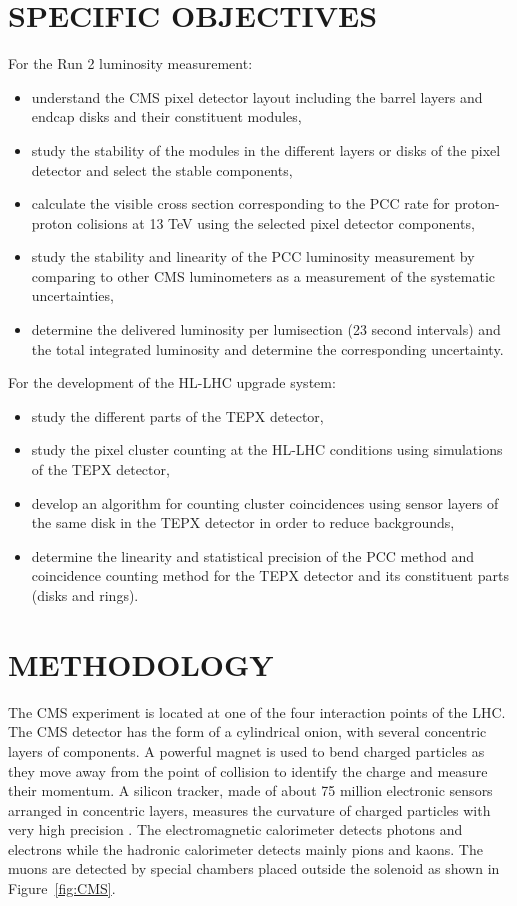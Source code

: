 \documentclass[final,12p]{article}
\begin{document}
\section{SPECIFIC OBJECTIVES}

For the Run 2 luminosity measurement:
\begin{itemize}
\item understand the CMS pixel detector layout including the barrel layers and endcap disks and their constituent modules,
\item study the stability of the modules in the different layers or disks of the pixel detector and select the stable components,
\item calculate the visible cross section corresponding to the PCC rate for proton-proton colisions at 13 TeV using the selected pixel detector components,
\item study the stability and linearity of the PCC luminosity measurement by comparing to other CMS luminometers as a measurement of the systematic uncertainties,
\item determine the delivered luminosity per lumisection (23 second intervals) and the total integrated luminosity and determine the corresponding uncertainty.
\end{itemize}

\par
For the development of the HL-LHC upgrade system:
\begin{itemize}
\item study the different parts of the TEPX detector,
\item study the pixel cluster counting at the HL-LHC conditions using simulations of the TEPX detector,
\item develop an algorithm for counting cluster coincidences using sensor layers of the same disk in the TEPX detector in order to reduce backgrounds,
\item determine the linearity and statistical precision of the PCC method and coincidence counting method for the TEPX detector and its constituent parts (disks and rings).
\end{itemize}


\section{METHODOLOGY}


The CMS experiment is located at one of the four interaction points of the LHC.
The CMS detector has the form of a cylindrical onion, with several concentric layers of components.
A powerful magnet is used to bend charged particles as they move away from the point of collision to identify the charge and measure their momentum.
A silicon tracker, made of about 75 million electronic sensors arranged in concentric layers, measures the curvature of charged particles with very high precision \cite{Chatrchyan:2008aa}.
The electromagnetic calorimeter detects photons and electrons while the hadronic calorimeter detects mainly pions and kaons.
The muons are detected by special chambers placed outside the solenoid as shown in Figure~\ref{fig:CMS}.
\end{document}
